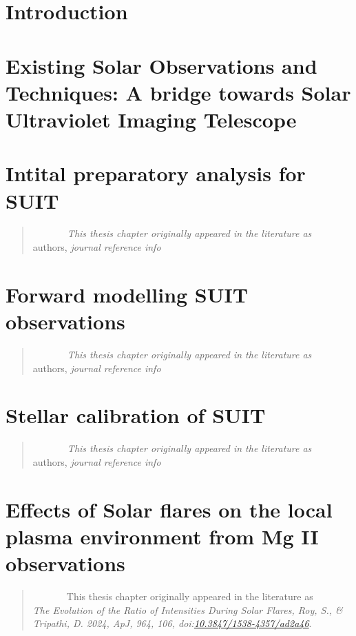 \documentclass[twoside]{hvdthesis}
\begin{document}
\chapter[Introduction]{Introduction}\label{c:intro}

\clearpage
%
\chapter{Existing Solar Observations and Techniques: A bridge towards Solar Ultraviolet Imaging Telescope}\label{c:chap2}

\clearpage
%
\chapter{Intital preparatory analysis for SUIT}\label{c:chap3}
\begin{quote}
{\em ~~~~~~~This thesis chapter originally appeared in the literature as} \\
{authors,
{\em journal reference info}}
\end{quote}

\clearpage
%
\chapter{Forward modelling SUIT observations}\label{c:chap4}
\begin{quote}
{\em ~~~~~~~This thesis chapter originally appeared in the literature as} \\
{authors,
{\em journal reference info}}
\end{quote}

%
\chapter{Stellar calibration of SUIT}\label{c:chap5}
\begin{quote}
{\em ~~~~~~~This thesis chapter originally appeared in the literature as} \\
{authors,
{\em journal reference info}}
\end{quote}

%
\chapter{Effects of Solar flares on the local plasma environment from Mg II observations}\label{c:chap6}
\begin{quote}
{ ~~~~~~~This thesis chapter originally appeared in the literature as} \\
{{\em The Evolution of the Ratio of  Intensities During Solar Flares, Roy, S., \& Tripathi, D. 2024, ApJ, 964, 106, doi:\href{https://iopscience.iop.org/article/10.3847/1538-4357/ad2a46}{10.3847/1538-4357/ad2a46}}.}
\end{quote}

\clearpage
%
\end{document}
